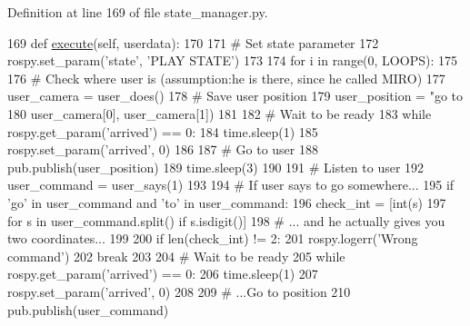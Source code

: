 Definition at line 169 of file state\+\_\+manager.\+py.


\begin{DoxyCode}
169     \textcolor{keyword}{def }\hyperlink{classstate__manager_1_1MIRO__Play_a781db4be4fcbb313c46097a8fdf06275}{execute}(self, userdata):
170 
171         \textcolor{comment}{# Set state parameter}
172         rospy.set\_param(\textcolor{stringliteral}{'state'}, \textcolor{stringliteral}{'PLAY STATE'})
173 
174         \textcolor{keywordflow}{for} i \textcolor{keywordflow}{in} range(0, LOOPS):
175 
176             \textcolor{comment}{# Check where user is (assumption:he is there, since he called MIRO)}
177             user\_camera = user\_does()
178             \textcolor{comment}{# Save user position}
179             user\_position = \textcolor{stringliteral}{"go to %
180                 user\_camera[0], user\_camera[1])
181 
182             \textcolor{comment}{# Wait to be ready}
183             \textcolor{keywordflow}{while} rospy.get\_param(\textcolor{stringliteral}{'arrived'}) == 0:
184                 time.sleep(1)
185             rospy.set\_param(\textcolor{stringliteral}{'arrived'}, 0)
186 
187             \textcolor{comment}{# Go to user}
188             pub.publish(user\_position)
189             time.sleep(3)
190 
191             \textcolor{comment}{# Listen to user}
192             user\_command = user\_says(1)
193 
194             \textcolor{comment}{# If user says to go somewhere...}
195             \textcolor{keywordflow}{if} \textcolor{stringliteral}{'go'} \textcolor{keywordflow}{in} user\_command \textcolor{keywordflow}{and} \textcolor{stringliteral}{'to'} \textcolor{keywordflow}{in} user\_command:
196                 check\_int = [int(s)
197                              \textcolor{keywordflow}{for} s \textcolor{keywordflow}{in} user\_command.split() \textcolor{keywordflow}{if} s.isdigit()]
198                 \textcolor{comment}{# ... and he actually gives you two coordinates...}
199 
200                 \textcolor{keywordflow}{if} len(check\_int) != 2:
201                     rospy.logerr(\textcolor{stringliteral}{'Wrong command'})
202                     \textcolor{keywordflow}{break}
203 
204                 \textcolor{comment}{# Wait to be ready}
205                 \textcolor{keywordflow}{while} rospy.get\_param(\textcolor{stringliteral}{'arrived'}) == 0:
206                     time.sleep(1)
207                 rospy.set\_param(\textcolor{stringliteral}{'arrived'}, 0)
208 
209                 \textcolor{comment}{# ...Go to position}
210                 pub.publish(user\_command)
}
\end{DoxyCode}
